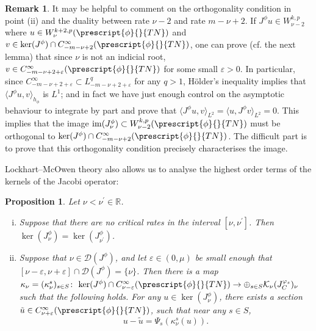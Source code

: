 \documentclass{article}
\numberwithin{equation}{section}        %
\theoremstyle{bfnote}
\newtheorem{prop}[thm]{Proposition}         %
\theoremstyle{definition}
\theoremstyle{bfremark}
\newtheorem{rem}[thm]{Remark}               %
\newcommand{\col}{\colon \thinspace}        %
\newcommand{\R}{\mathbb{R}}                 %
\DeclareMathOperator{\im}{im}                   %
\begin{document}
\begin{rem}
    It may be helpful to comment on the orthogonality condition in point (ii) and the duality between rate $\nu-2$ and rate $m-\nu+2$. If $J^\phi u \in W^{k,p}_{\nu-2}$ where $u \in W^{k+2,p}_\nu(\prescript{\phi}{}{TN})$ and $v \in \ker(J^\phi) \cap C^\infty_{-m-\nu+2}(\prescript{\phi}{}{TN})$, one can prove (cf. the next lemma) that since $\nu$ is not an indicial root, $v \in C^\infty_{-m-\nu+2+\varepsilon}(\prescript{\phi}{}{TN})$ for some small $\varepsilon > 0$. In particular, since $C^\infty_{-m-\nu+2+\varepsilon} \subset L^q_{-m-\nu+2+\varepsilon}$ for any $q > 1$, H\"older's inequality implies that $\langle J^\phi u, v \rangle_{h_\phi}$ is $L^1$; and in fact we have just enough control on the asymptotic behaviour to integrate by part and prove that $\langle J^\phi u, v \rangle_{L^2} = \langle u, J^\phi v \rangle_{L^2} = 0$. This implies that the image $\im(J^\phi_\nu) \subset W^{k,p}_{\nu-2}(\prescript{\phi}{}{TN})$ must be orthogonal to $\ker(J^\phi) \cap C^{\infty}_{-m-\nu+2}(\prescript{\phi}{}{TN})$. The difficult part is to prove that this orthogonality condition precisely characterises the image.
\end{rem}

Lockhart--McOwen theory also allows us to analyse the highest order terms of the kernels of the Jacobi operator:

\begin{prop}     \label{lem: kernels at different rates and leading order term}
    Let $\nu < \nu^\prime \in \R$.
    \begin{enumerate}[(i)]
        \item Suppose that there are no critical rates in the interval $[\nu,\nu^\prime]$. Then $\ker(J^\phi_\nu) = \ker(J^\phi_{\nu^\prime})$. 
        \item Suppose that $\nu \in \mathcal{D}(J^\phi)$, and let $\varepsilon \in (0,\mu)$ be small enough that $[\nu-\varepsilon,\nu+\varepsilon] \cap \mathcal{D}(J^\phi) = \{\nu\}$.  Then there is a map $\kappa_\nu = (\kappa^s_\nu)_{s\in S} \col \ker(J^\phi) \cap C^\infty_{\nu-\varepsilon}(\prescript{\phi}{}{TN}) \to \oplus_{s \in S} \mathcal{K}_\nu(J^{\varphi_s}_C)_\nu$ such that the following holds. For any $u \in \ker(J^\phi_\nu)$, there exists a section $\tilde u \in C^\infty_{\nu+\varepsilon}(\prescript{\phi}{}{TN})$, such that near any $s \in S$,
        \begin{equation*}
            u - \tilde{u} = \Psi_s(\kappa^s_\nu(u)) .
        \end{equation*}
    \end{enumerate}
\end{prop}
\end{document}
